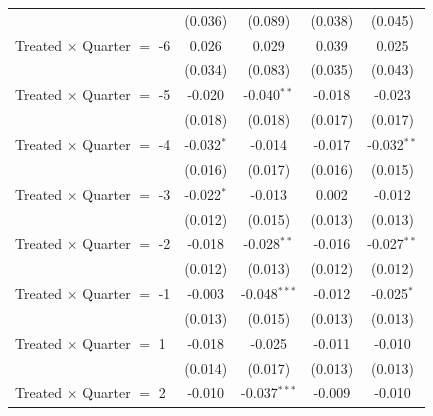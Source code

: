 \begin{longtable}{lcccc}
                                  & (0.036)                                   & (0.089)        & (0.038)      & (0.045)       \\
  Treated $\times$ Quarter $=$ -6 & 0.026                                     & 0.029          & 0.039        & 0.025         \\
                                  & (0.034)                                   & (0.083)        & (0.035)      & (0.043)       \\
  Treated $\times$ Quarter $=$ -5 & -0.020                                    & -0.040$^{**}$  & -0.018       & -0.023        \\
                                  & (0.018)                                   & (0.018)        & (0.017)      & (0.017)       \\
  Treated $\times$ Quarter $=$ -4 & -0.032$^{*}$                              & -0.014         & -0.017       & -0.032$^{**}$ \\
                                  & (0.016)                                   & (0.017)        & (0.016)      & (0.015)       \\
  Treated $\times$ Quarter $=$ -3 & -0.022$^{*}$                              & -0.013         & 0.002        & -0.012        \\
                                  & (0.012)                                   & (0.015)        & (0.013)      & (0.013)       \\
  Treated $\times$ Quarter $=$ -2 & -0.018                                    & -0.028$^{**}$  & -0.016       & -0.027$^{**}$ \\
                                  & (0.012)                                   & (0.013)        & (0.012)      & (0.012)       \\
  Treated $\times$ Quarter $=$ -1 & -0.003                                    & -0.048$^{***}$ & -0.012       & -0.025$^{*}$  \\
                                  & (0.013)                                   & (0.015)        & (0.013)      & (0.013)       \\
  Treated $\times$ Quarter $=$ 1  & -0.018                                    & -0.025         & -0.011       & -0.010        \\
                                  & (0.014)                                   & (0.017)        & (0.013)      & (0.013)       \\
  Treated $\times$ Quarter $=$ 2  & -0.010                                    & -0.037$^{***}$ & -0.009       & -0.010        \\

\end{longtable}
